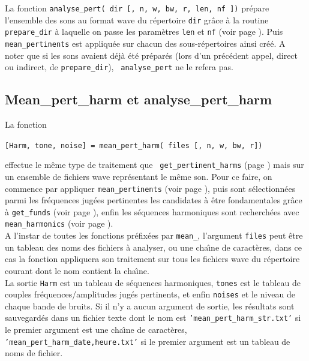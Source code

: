     La fonction {\tt analyse\_pert( dir [, n, w, bw, r, len, nf
    ])} pr{\'e}pare l'ensemble des sons au format wave du r{\'e}pertoire
    {\tt dir} gr{\^a}ce {\`a} la routine {\tt prepare\_dir} {\`a} laquelle on
    passe les param{\`e}tres {\tt len} et {\tt nf} (voir page
    \pageref{preparedir}). Puis {\tt mean\_pertinents} est
    appliqu{\'e}e sur chacun des sous-r{\'e}pertoires ainsi cr{\'e}{\'e}. A noter
    que si les sons avaient d{\'e}j{\`a} {\'e}t{\'e} pr{\'e}par{\'e}s (lors d'un pr{\'e}c{\'e}dent
    appel, direct ou indirect, de {\tt prepare\_dir}), {\tt
    analyse\_pert} ne le refera pas.


    \newpage
    \subsection{Mean\_pert\_harm et analyse\_pert\_harm}
    \label{meanpertharm}
    La fonction
    \begin{center}
    {\tt [Harm, tone, noise] = mean\_pert\_harm( files [, n, w, bw, r])}
    \end{center}
    effectue le m{\^e}me type de traitement que {\tt
    get\_pertinent\_harms} (page \pageref{getpertharm}) mais
    sur un ensemble de fichiers wave repr{\'e}sentant le m{\^e}me son.
    Pour ce faire, on commence par appliquer {\tt mean\_pertinents}
    (voir page \pageref{meanpertinents}), puis sont s{\'e}lectionn{\'e}es
    parmi les fr{\'e}quences jug{\'e}es pertinentes les candidates {\`a} {\^e}tre
    fondamentales gr{\^a}ce {\`a} {\tt get\_funds} (voir page
    \pageref{getfunds}), enfin les s{\'e}quences harmoniques
    sont recherch{\'e}es avec {\tt mean\_harmonics} (voir page
    \pageref{meanharmonics}).\\

    A l'instar de toutes les fonctions pr{\'e}fix{\'e}es par {\tt mean\_},
    l'argument {\tt files} peut {\^e}tre un tableau des noms des
    fichiers {\`a} analyser, ou une cha{\^\i}ne de caract{\`e}res, dans ce
    cas la fonction appliquera son traitement sur tous les
    fichiers wave du r{\'e}pertoire courant dont le nom contient la
    cha{\^\i}ne.\\

    La sortie {\tt Harm} est un tableau de s{\'e}quences
    harmoniques, {\tt tones} est le tableau de couples
    fr{\'e}quences/amplitudes jug{\'e}s pertinents, et enfin {\tt noises}
    et le niveau de chaque bande de bruits. Si il n'y a aucun
    argument de sortie, les r{\'e}sultats sont sauvegard{\'e}s dans un
    fichier texte dont le nom est {\tt 'mean\_pert\_harm\_str.txt'}
    si le premier argument est une cha{\^\i}ne de caract{\`e}res,
    {\tt 'mean\_pert\_harm\_date,heure.txt'} si le premier argument
    est un tableau de noms de fichier.\\

